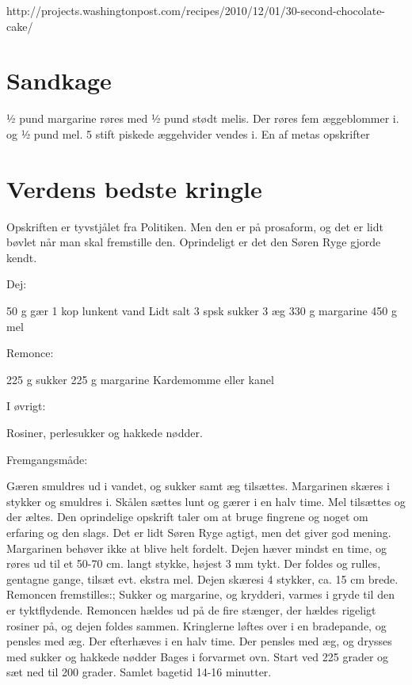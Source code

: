 \documentclass[
  letterpaper,
  DIV=11,
  numbers=noendperiod]{scrreprt}
\begin{document}
http://projects.washingtonpost.com/recipes/2010/12/01/30-second-chocolate-cake/

\hypertarget{sandkage}{%
\section{Sandkage}\label{sandkage}}

½ pund margarine røres med ½ pund stødt melis. Der røres fem æggeblommer
i. og ½ pund mel. 5 stift piskede æggehvider vendes i. En af metas
opskrifter

\hypertarget{verdens-bedste-kringle}{%
\section{Verdens bedste kringle}\label{verdens-bedste-kringle}}

Opskriften er tyvstjålet fra Politiken. Men den er på prosaform, og det
er lidt bøvlet når man skal fremstille den. Oprindeligt er det den Søren
Ryge gjorde kendt.

Dej:

50 g gær 1 kop lunkent vand Lidt salt 3 spsk sukker 3 æg 330 g margarine
450 g mel

Remonce:

225 g sukker 225 g margarine Kardemomme eller kanel

I øvrigt:

Rosiner, perlesukker og hakkede nødder.

Fremgangsmåde:

Gæren smuldres ud i vandet, og sukker samt æg tilsættes. Margarinen
skæres i stykker og smuldres i. Skålen sættes lunt og gærer i en halv
time. Mel tilsættes og der æltes. Den oprindelige opskrift taler om at
bruge fingrene og noget om erfaring og den slags. Det er lidt Søren Ryge
agtigt, men det giver god mening. Margarinen behøver ikke at blive helt
fordelt. Dejen hæver mindst en time, og røres ud til et 50-70 cm. langt
stykke, højest 3 mm tykt. Der foldes og rulles, gentagne gange, tilsæt
evt. ekstra mel. Dejen skæresi 4 stykker, ca. 15 cm brede. Remoncen
fremstilles:; Sukker og margarine, og krydderi, varmes i gryde til den
er tyktflydende. Remoncen hældes ud på de fire stænger, der hældes
rigeligt rosiner på, og dejen foldes sammen. Kringlerne løftes over i en
bradepande, og pensles med æg. Der efterhæves i en halv time. Der
pensles med æg, og drysses med sukker og hakkede nødder Bages i
forvarmet ovn. Start ved 225 grader og sæt ned til 200 grader. Samlet
bagetid 14-16 minutter.
\end{document}
